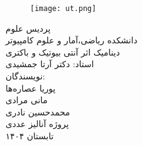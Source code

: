 \vspace*{\fill}
	\begin{figure}[htp]
		\centering \texttt{[image: ut.png]}
	\end{figure}
	\begin{center}
		\large
		پردیس علوم
		\\
		دانشکده ریاضی،آمار و علوم کامپیوتر
		\\
		{\LARGE دینامیک اثر آنتی بیوتیک و باکتری} \\
		\vspace{1cm}
		استاد: دکتر آرتا جمشیدی
		\\
		\vspace{1cm}
		نویسندگان:\\
		پوریا عصاره‌ها\\
		مانی مرادی\\
		محمدحسین نادری\\
		\vspace{1cm}
		پروژه آنالیز عددی
		\\		
		تابستان ۱۴۰۴
		\vspace{2cm}
	\end{center}
	\thispagestyle{empty}
	\vspace*{\fill}